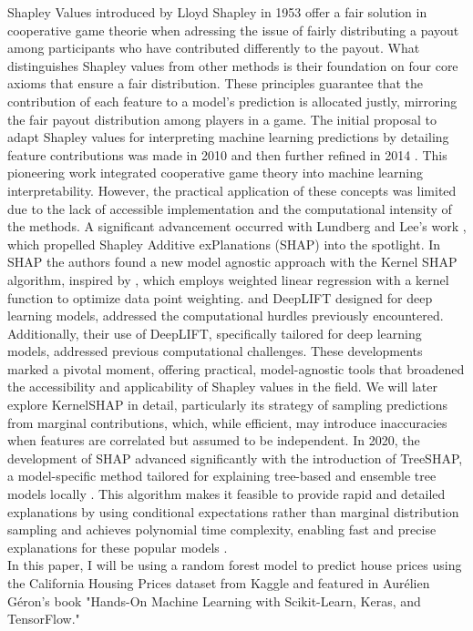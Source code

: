 \documentclass[12pt]{article}
\begin{document}
Shapley Values introduced by Lloyd Shapley in 1953 offer a fair solution in cooperative game theorie when adressing the issue of fairly distributing a payout among participants who have contributed differently to the payout.
What distinguishes Shapley values from other methods is their foundation on four core axioms that ensure a fair distribution. These principles guarantee that the contribution of each feature to a model's prediction is allocated justly, mirroring the fair payout distribution among players in a game. 
The initial proposal to adapt Shapley values for interpreting machine learning predictions by detailing feature contributions was made in 2010 \cite{article2} and then further refined in 2014 \cite{article3}.
This pioneering work integrated cooperative game theory into machine learning interpretability.
However, the practical application of these concepts was limited due to the lack of accessible implementation and the computational intensity of the methods. 
A significant advancement occurred with Lundberg and Lee's work \cite{10.5555/3295222.3295230} , which propelled Shapley Additive exPlanations (SHAP) into the spotlight.
 In SHAP the authors found a new model agnostic approach with the Kernel SHAP algorithm, inspired by \cite{10.1145/2939672.2939778}, which employs weighted linear regression with a kernel function to optimize data point weighting.  and DeepLIFT designed for deep learning models, addressed the computational hurdles previously encountered.
Additionally, their use of DeepLIFT, specifically tailored for deep learning models, addressed previous computational challenges. These developments marked a pivotal moment, offering practical, model-agnostic tools that broadened the accessibility and applicability of Shapley values in the field.
We will later explore KernelSHAP in detail, particularly its strategy of sampling predictions from marginal contributions, which, while efficient, may introduce inaccuracies when features are correlated but assumed to be independent.
In 2020, the development of SHAP advanced significantly with the introduction of TreeSHAP, a model-specific method tailored for explaining tree-based and ensemble tree models locally  \cite{unknown}. 
This algorithm makes it feasible to provide rapid and detailed explanations by using conditional expectations rather than marginal distribution sampling and achieves polynomial time complexity, enabling fast and precise explanations for these popular models \cite{lundberg2019consistent}.\\
In this paper, I will be using a random forest model to predict house prices using the California Housing Prices dataset from Kaggle and featured in Aurélien Géron's book "Hands-On Machine Learning with Scikit-Learn, Keras, and TensorFlow."
\end{document}
